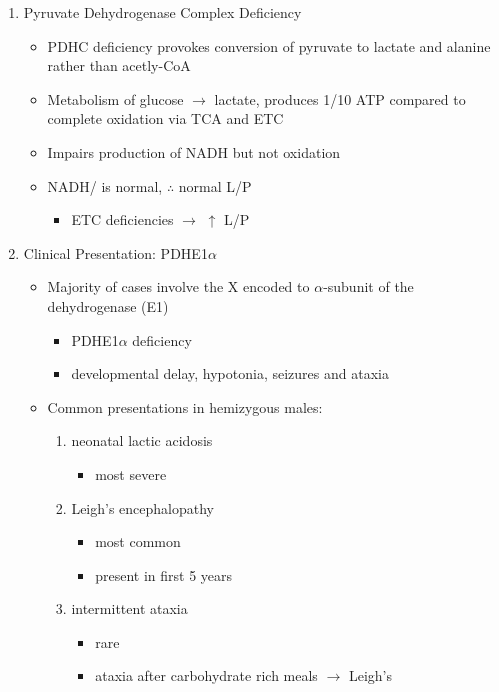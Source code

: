 \documentclass{scrartcl}
\begin{document}
\begin{enumerate}
\item Pyruvate Dehydrogenase Complex Deficiency
\label{sec:org52f65a1}
\begin{itemize}
\item PDHC deficiency provokes conversion of pyruvate to lactate and alanine rather than acetly-CoA
\item Metabolism of glucose \(\to\) lactate, produces 1/10 ATP compared to
complete oxidation via TCA and ETC
\item Impairs production of NADH but not oxidation
\item NADH/ is normal, \(\therefore\) normal L/P
\begin{itemize}
\item ETC deficiencies \(\to\) \(\uparrow\) L/P
\end{itemize}
\end{itemize}

\item Clinical Presentation: PDHE1\(\alpha\)
\label{sec:org2f3182e}
\begin{itemize}
\item Majority of cases involve the X encoded to \(\alpha\)-subunit of the dehydrogenase (E1)
\begin{itemize}
\item PDHE1\(\alpha\) deficiency
\item developmental delay, hypotonia, seizures and ataxia
\end{itemize}

\item Common presentations in hemizygous males:
\begin{enumerate}
\item neonatal lactic acidosis
\begin{itemize}
\item most severe
\end{itemize}
\item Leigh's encephalopathy
\begin{itemize}
\item most common
\item present in first 5 years
\end{itemize}
\item intermittent ataxia
\begin{itemize}
\item rare
\item ataxia after carbohydrate rich meals \(\to\) Leigh's
\end{itemize}
\end{enumerate}


\end{itemize}
\end{enumerate}
\end{document}
